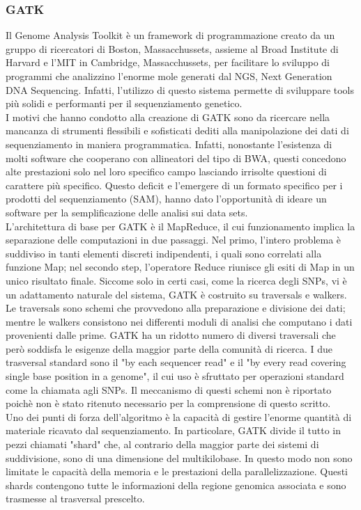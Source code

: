 \subsubsection{GATK}
Il Genome Analysis Toolkit è un framework di programmazione creato da un gruppo di ricercatori di Boston, Massacchussets, assieme al Broad Institute di Harvard e l'MIT in Cambridge, Massacchussets, per facilitare lo sviluppo di programmi che analizzino l'enorme mole generati dal NGS, Next Generation DNA Sequencing. Infatti, l'utilizzo di questo sistema permette di sviluppare tools più solidi e performanti per il sequenziamento genetico. \\
I motivi che hanno condotto alla creazione di GATK sono da ricercare nella mancanza di strumenti flessibili e sofisticati dediti alla manipolazione dei dati di sequenziamento in maniera programmatica. Infatti, nonostante l'esistenza di molti software che cooperano con allineatori del tipo di BWA, questi concedono alte prestazioni solo nel loro specifico campo lasciando irrisolte questioni di carattere più specifico. Questo deficit e l'emergere di un formato specifico per i prodotti del sequenziamento (SAM), hanno dato l'opportunità di ideare un software per la semplificazione delle analisi sui data sets.\\
L'architettura di base per GATK è il MapReduce, il cui funzionamento implica la separazione delle computazioni in due passaggi. Nel primo, l'intero problema è suddiviso in tanti elementi discreti indipendenti, i quali sono correlati alla funzione Map; nel secondo step, l'operatore Reduce riunisce gli esiti di Map in un unico risultato finale. Siccome solo in certi casi, come la ricerca degli SNPs, vi è un adattamento naturale del sistema, GATK è costruito su traversals e walkers. Le traversals sono schemi che provvedono alla preparazione e divisione dei dati; mentre le walkers consistono nei differenti moduli di analisi che computano i dati provenienti dalle prime. GATK ha un ridotto numero di diversi traversali che però soddisfa le esigenze della maggior parte della comunità di ricerca. I due trasversal standard sono il "by each sequencer read" e il "by every read covering single base position in a genome", il cui uso è sfruttato per operazioni standard come la chiamata agli SNPs. Il meccanismo di questi schemi non è riportato poichè non è stato ritenuto necessario per la comprensione di questo scritto.\\
Uno dei punti di forza dell'algoritmo è la capacità di gestire l'enorme quantità di materiale ricavato dal sequenziamento. In particolare, GATK divide il tutto in pezzi chiamati "shard" che, al contrario della maggior parte dei sistemi di suddivisione, sono di una dimensione del multikilobase. In questo modo non sono limitate le capacità della memoria e le prestazioni della parallelizzazione. Questi shards contengono tutte le informazioni della regione genomica associata e sono trasmesse al trasversal prescelto.\\
